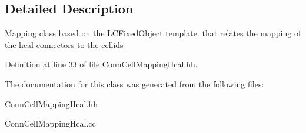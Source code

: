 \subsection{Detailed Description}
Mapping class based on the LCFixedObject template. that relates the mapping of the hcal connectors to the cellids 

Definition at line 33 of file ConnCellMappingHcal.hh.

The documentation for this class was generated from the following files:\begin{DoxyCompactItemize}
\item 
ConnCellMappingHcal.hh\item 
ConnCellMappingHcal.cc\end{DoxyCompactItemize}
